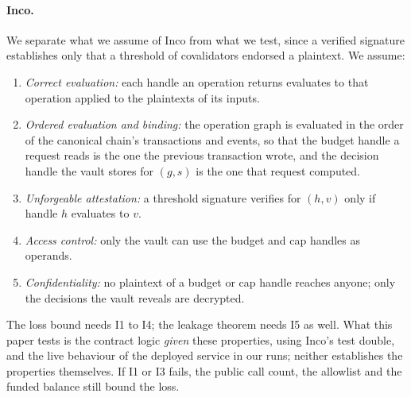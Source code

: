 \paragraph{Inco.} We separate what we assume of Inco from what we test, since a verified signature
establishes only that a threshold of covalidators endorsed a plaintext. We assume:
\begin{enumerate}[(I1)]
  \item \emph{Correct evaluation:} each handle an operation returns evaluates to that operation applied to
        the plaintexts of its inputs.
  \item \emph{Ordered evaluation and binding:} the operation graph is evaluated in the order of the
        canonical chain's transactions and events, so that the budget handle a request reads is the one
        the previous transaction wrote, and the decision handle the vault stores for $(g, s)$ is the one
        that request computed.
  \item \emph{Unforgeable attestation:} a threshold signature verifies for $(h, v)$ only if handle $h$
        evaluates to $v$.
  \item \emph{Access control:} only the vault can use the budget and cap handles as operands.
  \item \emph{Confidentiality:} no plaintext of a budget or cap handle reaches anyone; only the decisions the
        vault reveals are decrypted.
\end{enumerate}
The loss bound needs I1 to I4; the leakage theorem needs I5 as well. What this paper tests is the
contract logic \emph{given} these properties, using Inco's test double, and the live behaviour of the deployed
service in our runs; neither establishes the properties themselves. If I1 or I3 fails, the public call count,
the allowlist and the funded balance still bound the loss.
